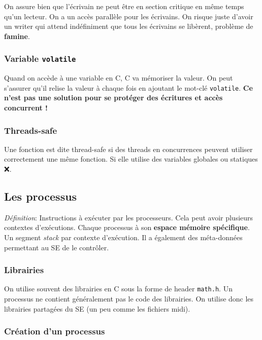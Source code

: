On assure bien que l'écrivain ne peut être en section critique en même
temps qu'un lecteur. On a un accès parallèle pour les écrivains. On
risque juste d'avoir un writer qui attend indéfiniment que tous les
écrivains se libèrent, problème de \textbf{famine}.

\subsubsection{\texorpdfstring{Variable
\texttt{volatile}}{Variable volatile}}\label{variable-volatile}

Quand on accède à une variable en C, C va mémoriser la valeur. On peut
s'assurer qu'il relise la valeur à chaque fois en ajoutant le mot-clé
\texttt{volatile}. \textbf{Ce n'est pas une solution pour se protéger
des écritures et accès concurrent !}

\subsubsection{Threads-safe}\label{threads-safe}

Une fonction est dite thread-safe si des threads en concurrences peuvent
utiliser correctement une même fonction. Si elle utilise des variables
globales ou statiques ❌.

\subsection{Les processus}\label{les-processus}

\emph{Définition}: Instructions à exécuter par les processeurs. Cela
peut avoir plusieurs contextes d'exécutions. Chaque processus à son
\textbf{espace mémoire spécifique}. Un segment \emph{stack} par contexte
d'exécution. Il a également des méta-données permettant au SE de le
contrôler.

\subsubsection{Librairies}\label{librairies}

On utilise souvent des librairies en C sous la forme de header
\texttt{math.h}. Un processus ne contient généralement pas le code des
librairies. On utilise donc les librairies partagées du SE (un peu comme
les fichiers midi).

\subsubsection{Création d'un processus}\label{cruxe9ation-dun-processus}

